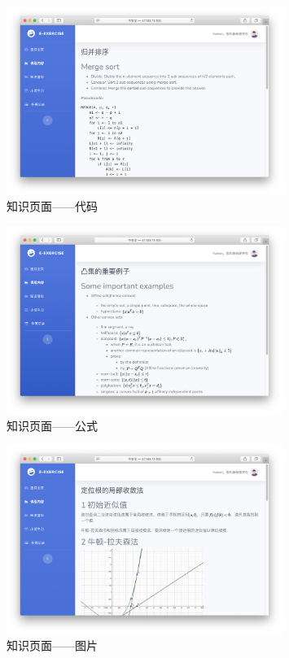 \documentclass{nwafucoursepaper}
\begin{document}
\begin{figure}[htp]
  \centering
  \includegraphics[width=0.8\textwidth]{knowledge_code.png}
  \caption{知识页面——代码}
  \label{knowledge_code}
\end{figure}

\begin{figure}[htp]
  \centering
  \includegraphics[width=0.8\textwidth]{knowledge_math.png}
  \caption{知识页面——公式}
  \label{knowledge_math}
\end{figure}

\begin{figure}[htp]
  \centering
  \includegraphics[width=0.8\textwidth]{knowledge_image.png}
  \caption{知识页面——图片}
  \label{knowledge_image}
\end{figure}
\end{document}
